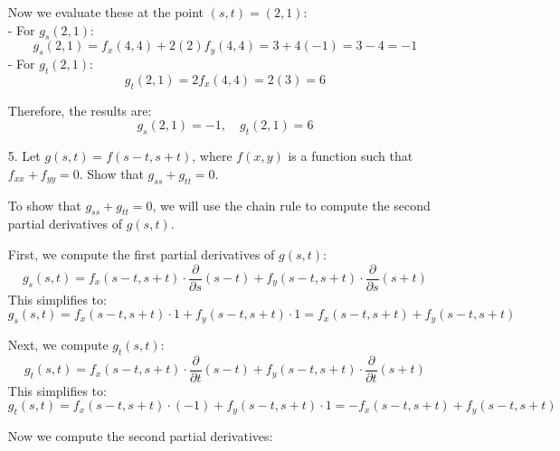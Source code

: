 \documentclass[reqno, 12pt]{amsart}
\begin{document}
\begin{itemize}
\begin{answerbox}
        Now we evaluate these at the point $(s,t) = (2,1)$: \\
        - For $g_s(2,1)$:
            \[
            g_s(2,1) = f_x(4,4) + 2(2)f_y(4,4) = 3 + 4(-1) = 3 - 4 = -1
            \]
        - For $g_t(2,1)$:
            \[
            g_t(2,1) = 2f_x(4,4) = 2(3) = 6
            \]
    
        Therefore, the results are:
        \[
            g_s(2,1) = -1, \quad g_t(2,1) = 6
        \]
    \end{answerbox}

    \newpage
  \item[5.] Let $g(s,t) = f(s-t,s+t)$, where $f(x,y)$ is a function such that $f_{xx}+f_{yy} = 0$. Show that $g_{ss}+g_{tt} = 0$.
    \newline

    \begin{answerbox}
        To show that $g_{ss} + g_{tt} = 0$, we will use the chain rule to compute the second partial derivatives of $g(s,t)$.
    
        First, we compute the first partial derivatives of $g(s,t)$:
        \[
            g_s(s,t) = f_x(s-t, s+t) \cdot \frac{\partial}{\partial s}(s-t) + f_y(s-t, s+t) \cdot \frac{\partial}{\partial s}(s+t)
        \]
        This simplifies to:
        \[
            g_s(s,t) = f_x(s-t, s+t) \cdot 1 + f_y(s-t, s+t) \cdot 1 = f_x(s-t, s+t) + f_y(s-t, s+t)
        \]
    
        Next, we compute $g_t(s,t)$:
        \[
            g_t(s,t) = f_x(s-t, s+t) \cdot \frac{\partial}{\partial t}(s-t) + f_y(s-t, s+t) \cdot \frac{\partial}{\partial t}(s+t)
        \]
        This simplifies to:
        \[
            g_t(s,t) = f_x(s-t, s+t) \cdot (-1) + f_y(s-t, s+t) \cdot 1 = -f_x(s-t, s+t) + f_y(s-t, s+t)
        \]
    
        Now we compute the second partial derivatives:
        

\end{answerbox}
\end{itemize}
\end{document}
